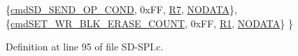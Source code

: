 \begin{DoxyCode}
    \{\hyperlink{_s_d-_s_p_i_8h_a1823d137ba816c2789769b7237e92aa8}{cmdSD\_SEND\_OP\_COND},        0xFF,   \hyperlink{_s_d-_s_p_i_8h_a69658e0ba42c5888b733c1ef68ae5187a054fa446dec19779f7d15d8cc5fca5cf}{R7},     \hyperlink{_s_d-_s_p_i_8h_a6a2e6b3670a920656095b739efe77613}{NODATA}\}, 
    \{\hyperlink{_s_d-_s_p_i_8h_aaeca80cb394e4cc0de547098849512dc}{cmdSET\_WR\_BLK\_ERASE\_COUNT}, 0xFF,   \hyperlink{_s_d-_s_p_i_8h_a69658e0ba42c5888b733c1ef68ae5187af8d87ff07efe24755164f550526f4dac}{R1},     
      \hyperlink{_s_d-_s_p_i_8h_a6a2e6b3670a920656095b739efe77613}{NODATA}\}
\}
\end{DoxyCode}


Definition at line 95 of file S\+D-\/\+S\+P\+I.\+c.

